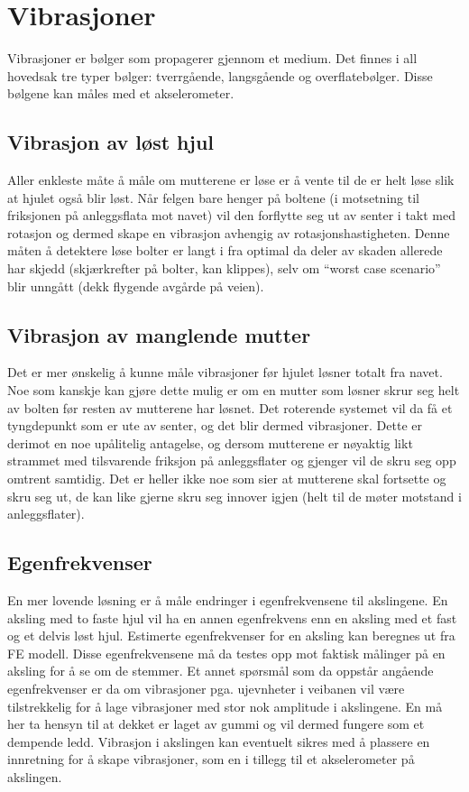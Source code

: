 \section{Vibrasjoner}
Vibrasjoner er bølger som propagerer gjennom et medium. Det finnes i 
all hovedsak tre typer bølger: tverrgående, langsgående og overflatebølger. 
Disse bølgene kan måles med et akselerometer.

\subsection{Vibrasjon av løst hjul}
Aller enkleste måte å måle om mutterene er løse er å vente til 
de er helt løse slik at hjulet også blir løst. Når felgen bare 
henger på boltene (i motsetning til friksjonen på anleggsflata 
mot navet) vil den forflytte seg ut av senter i takt med rotasjon 
og dermed skape en vibrasjon avhengig av rotasjonshastigheten. 
Denne måten å detektere løse bolter er langt i fra optimal da deler 
av skaden allerede har skjedd (skjærkrefter på bolter, kan klippes),
 selv om ``worst case scenario'' blir unngått (dekk flygende avgårde på veien).

\subsection{Vibrasjon av manglende mutter}
Det er mer ønskelig å kunne måle vibrasjoner før hjulet løsner totalt
fra navet. Noe som kanskje kan gjøre dette mulig er om en mutter som løsner
skrur seg helt av bolten før resten av mutterene har løsnet. Det roterende systemet vil
da få et tyngdepunkt som er ute av senter, og det blir dermed vibrasjoner.
Dette er derimot en noe upålitelig antagelse, og dersom mutterene er nøyaktig
likt strammet med tilsvarende friksjon på anleggsflater og gjenger vil de skru seg opp omtrent samtidig.
Det er heller ikke noe som sier at mutterene skal fortsette og skru seg ut, de kan like 
gjerne skru seg innover igjen (helt til de møter motstand i anleggsflater).

\subsection{Egenfrekvenser}
En mer lovende løsning er å måle endringer i egenfrekvensene til 
akslingene. En aksling med to faste hjul vil ha en annen egenfrekvens 
enn en aksling med et fast og et delvis løst hjul. Estimerte egenfrekvenser 
for en aksling kan beregnes ut fra FE modell. \cite{asme}\cite{sagepub} Disse egenfrekvensene må 
da testes opp mot faktisk målinger på en aksling for å se om de stemmer. 
Et annet spørsmål som da oppstår angående egenfrekvenser er da om 
vibrasjoner pga. ujevnheter i veibanen vil være tilstrekkelig for å lage 
vibrasjoner med stor nok amplitude i akslingene. En må her ta hensyn til 
at dekket er laget av gummi og vil dermed fungere som et dempende ledd. 
Vibrasjon i akslingen kan eventuelt sikres med å plassere en innretning for 
å skape vibrasjoner, som en i tillegg til et akselerometer på akslingen.
